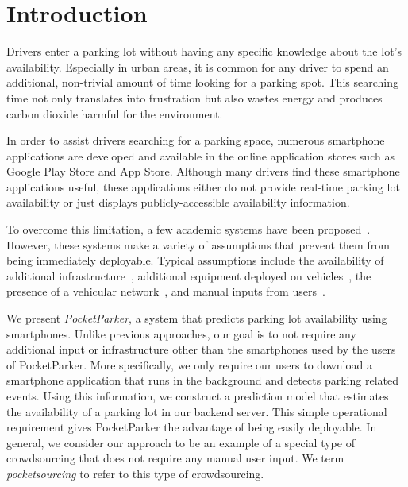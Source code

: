 \section{Introduction}

Drivers enter a parking lot without having any specific knowledge about the
lot's availability. Especially in urban areas, it is common for any driver to
spend an additional, non-trivial amount of time looking for a parking spot. This
searching time not only translates into frustration but also wastes energy and
produces carbon dioxide harmful for the environment.

In order to assist drivers searching for a parking space, numerous smartphone
applications are developed and available in the online application stores such
as Google Play Store and App Store. Although many drivers find these smartphone
applications useful, these applications either do not provide real-time parking
lot availability or just displays publicly-accessible availability information.

To overcome this limitation, a few academic systems have been
proposed~\cite{4212497, Chen:2012:COS, Delot:2009:CRP, 5062057,
Mathur:2010:PDS}. However, these systems make a variety of assumptions that
prevent them from being immediately deployable. Typical assumptions include the
availability of additional infrastructure~\cite{5062057}, additional equipment
deployed on vehicles~\cite{Mathur:2010:PDS}, the presence of a vehicular
network~\cite{Delot:2009:CRP, Mathur:2010:PDS, 4212497}, and manual inputs from
users~\cite{Chen:2012:COS}.

We present {\it PocketParker}, a system that predicts parking lot availability
using smartphones. Unlike previous approaches, our goal is to not require any
additional input or infrastructure other than the smartphones used by the users
of PocketParker. More specifically, we only require our users to download a
smartphone application that runs in the background and detects parking related
events. Using this information, we construct a prediction model that estimates
the availability of a parking lot in our backend server. This simple operational
requirement gives PocketParker the advantage of being easily deployable. In
general, we consider our approach to be an example of a special type of
crowdsourcing that does not require any manual user input. We term {\it
pocketsourcing} to refer to this type of crowdsourcing.

